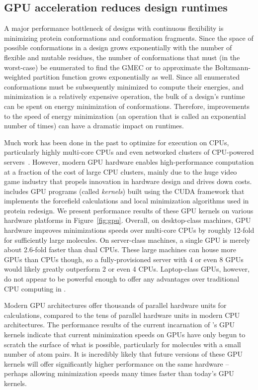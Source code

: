 
\subsection{GPU acceleration reduces design runtimes}

A major performance bottleneck of \osprey designs with continuous flexibility is minimizing protein conformations and conformation fragments. Since the space of possible conformations in a design grows exponentially with the number of flexible and mutable residues, the number of conformations that must (in the worst-case) be enumerated to find the GMEC or to approximate the Boltzmann-weighted partition function grows exponentially as well. Since all enumerated conformations must be subsequently minimized to compute their energies, and minimization is a relatively expensive operation, the bulk of a design's runtime can be spent on energy minimization of conformations. Therefore, improvements to the speed of energy minimization (an operation that is called an exponential number of times) can have a dramatic impact on \osprey runtimes.

Much work has been done in the past to optimize \osprey for execution on CPUs, particularly highly multi-core CPUs and even networked clusters of CPU-powered servers~\cite{minBounds_DACS,cloud_OSPREY}. However, modern GPU hardware enables high-performance computation at a fraction of the cost of large CPU clusters, mainly due to the huge video game industry that propels innovation in hardware design and drives down costs.  includes GPU programs (called {\it kernels}) built using the CUDA framework that implements the forcefield calculations and local minimization algorithms used in protein redesign. We present performance results of these GPU kernels on various hardware platforms in Figure~\ref{fig:gpu}. Overall, on desktop-class machines, GPU hardware improves minimizations speeds over multi-core CPUs by roughly 12-fold for sufficiently large molecules. On server-class machines, a single GPU is merely about 2.6-fold faster than dual CPUs. These large machines can house more GPUs than CPUs though, so a fully-provisioned server with 4 or even 8 GPUs would likely greatly outperform 2 or even 4 CPUs. Laptop-class GPUs, however, do not appear to be powerful enough to offer any advantages over traditional CPU computing in .

Modern GPU architectures offer thousands of parallel hardware units for calculations, compared to the tens of parallel hardware units in modern CPU architectures. The performance results of the current incarnation of \osprey's GPU kernels indicate that current minimization speeds on GPUs have only begun to scratch the surface of what is possible, particularly for molecules with a small number of atom pairs. It is incredibly likely that future versions of these GPU kernels will offer significantly higher performance on the same hardware -- perhaps allowing minimization speeds many times faster than today's GPU kernels.

